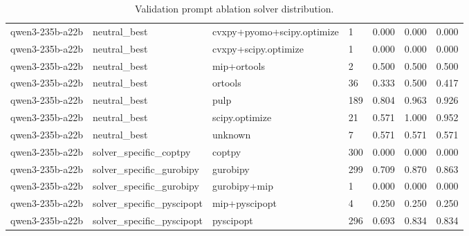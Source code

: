 \begin{table}[t]
\begin{tabular}{lllllll}
qwen3-235b-a22b & neutral\_best & cvxpy+pyomo+scipy.optimize & 1 & 0.000 & 0.000 & 0.000 \\
qwen3-235b-a22b & neutral\_best & cvxpy+scipy.optimize & 1 & 0.000 & 0.000 & 0.000 \\
qwen3-235b-a22b & neutral\_best & mip+ortools & 2 & 0.500 & 0.500 & 0.500 \\
qwen3-235b-a22b & neutral\_best & ortools & 36 & 0.333 & 0.500 & 0.417 \\
qwen3-235b-a22b & neutral\_best & pulp & 189 & 0.804 & 0.963 & 0.926 \\
qwen3-235b-a22b & neutral\_best & scipy.optimize & 21 & 0.571 & 1.000 & 0.952 \\
qwen3-235b-a22b & neutral\_best & unknown & 7 & 0.571 & 0.571 & 0.571 \\
qwen3-235b-a22b & solver\_specific\_coptpy & coptpy & 300 & 0.000 & 0.000 & 0.000 \\
qwen3-235b-a22b & solver\_specific\_gurobipy & gurobipy & 299 & 0.709 & 0.870 & 0.863 \\
qwen3-235b-a22b & solver\_specific\_gurobipy & gurobipy+mip & 1 & 0.000 & 0.000 & 0.000 \\
qwen3-235b-a22b & solver\_specific\_pyscipopt & mip+pyscipopt & 4 & 0.250 & 0.250 & 0.250 \\
qwen3-235b-a22b & solver\_specific\_pyscipopt & pyscipopt & 296 & 0.693 & 0.834 & 0.834 \\
\bottomrule
\end{tabular}
\caption{Validation prompt ablation solver distribution.}
\label{tab:or_eval_ablation}
\end{table}